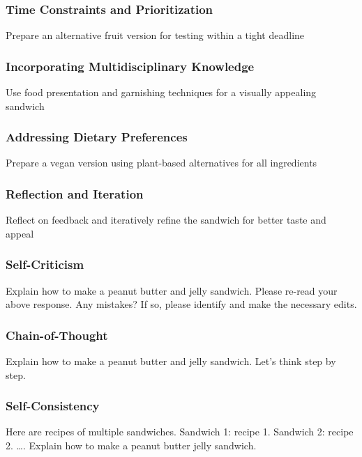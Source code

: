 \begin{frame}[fragile]\frametitle{Time Constraints and Prioritization}

Prepare an alternative fruit version for testing within a tight deadline

\end{frame}

\begin{frame}[fragile]\frametitle{Incorporating Multidisciplinary Knowledge}

Use food presentation and garnishing techniques for a visually appealing sandwich

\end{frame}

\begin{frame}[fragile]\frametitle{Addressing Dietary Preferences}

Prepare a vegan version using plant-based alternatives for all ingredients

\end{frame}

\begin{frame}[fragile]\frametitle{Reflection and Iteration}

Reflect on feedback and iteratively refine the sandwich for better taste and appeal

\end{frame}

\begin{frame}[fragile]\frametitle{Self-Criticism}

Explain how to make a peanut butter and jelly sandwich. Please re-read your above response. Any mistakes? If so, please identify and make the necessary edits.

\end{frame}

\begin{frame}[fragile]\frametitle{Chain-of-Thought}

Explain how to make a peanut butter and jelly sandwich. Let’s think step by step.

\end{frame}

\begin{frame}[fragile]\frametitle{Self-Consistency}

Here are recipes of multiple sandwiches. Sandwich 1: recipe 1. Sandwich 2: recipe 2. \ldots. Explain how to make a peanut butter jelly sandwich. 

\end{frame}

